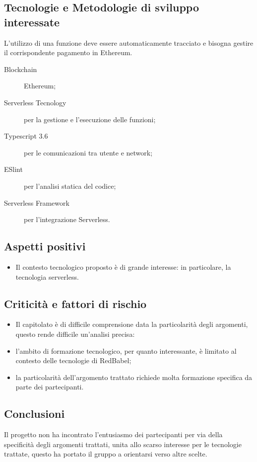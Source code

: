 \documentclass[../studio-di-fattibilita.tex]{subfiles}
\begin{document}
  \subsection{Tecnologie e Metodologie di sviluppo interessate}%
  \label{subsec:tecnologie_interessate}
    L'utilizzo di una funzione deve essere automaticamente tracciato e bisogna gestire il corrispondente pagamento in Ethereum.
  \begin{description}
    \item[Blockchain] Ethereum;
    \item[Serverless Tecnology] per la gestione e l'esecuzione delle funzioni;
    \item[Typescript 3.6] per le comunicazioni tra utente e network;
    \item[ESlint] per l'analisi statica del codice;
    \item[Serverless Framework] per l'integrazione Serverless.
  \end{description}
  \subsection{Aspetti positivi}%
  \label{subsec:aspetti_positivi}
  \begin{itemize}
    \item Il contesto tecnologico proposto è di grande interesse: in particolare, la tecnologia serverless.
  \end{itemize}
  \subsection{Criticità e fattori di rischio}%
  \label{subsec:criticita_e_fattori_di_rischio}
  \begin{itemize}
    \item Il capitolato è di difficile comprensione data la particolarità degli argomenti, questo rende difficile un'analisi precisa:
    \item l'ambito di formazione tecnologico, per quanto interessante, è limitato al contesto delle tecnologie di RedBabel;
    \item la particolarità dell'argomento trattato richiede molta formazione specifica da parte dei partecipanti.
  \end{itemize}
  \subsection{Conclusioni}%
  \label{subsec:conclusioni}
  Il progetto non ha incontrato l'entusiasmo dei partecipanti per via della specificità degli argomenti trattati, unita allo scarso interesse per le tecnologie trattate, questo ha portato il gruppo a orientarsi verso altre scelte.
\end{document}
